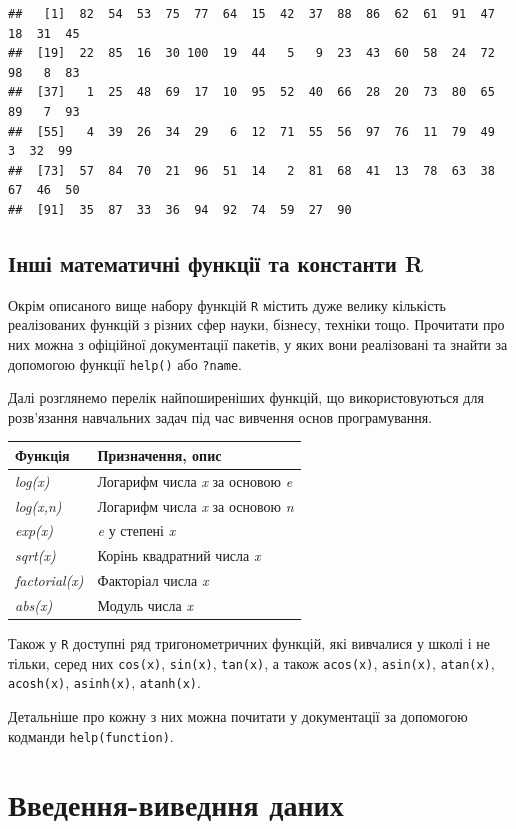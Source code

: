 \documentclass[
]{book}
\begin{document}
\begin{verbatim}
##   [1]  82  54  53  75  77  64  15  42  37  88  86  62  61  91  47  18  31  45
##  [19]  22  85  16  30 100  19  44   5   9  23  43  60  58  24  72  98   8  83
##  [37]   1  25  48  69  17  10  95  52  40  66  28  20  73  80  65  89   7  93
##  [55]   4  39  26  34  29   6  12  71  55  56  97  76  11  79  49   3  32  99
##  [73]  57  84  70  21  96  51  14   2  81  68  41  13  78  63  38  67  46  50
##  [91]  35  87  33  36  94  92  74  59  27  90
\end{verbatim}

\hypertarget{chapter244}{%
\subsection{Інші математичні функції та константи R}\label{chapter244}}

Окрім описаного вище набору функцій \texttt{R} містить дуже велику кількість реалізованих функцій з різних сфер науки, бізнесу, техніки тощо. Прочитати про них можна з офіційної документації пакетів, у яких вони реалізовані та знайти за допомогою функції \texttt{help()} або \texttt{?name}.

Далі розглянемо перелік найпоширеніших функцій, що використовуються для розв'язання навчальних задач під час вивчення основ програмування.

\begin{longtable}[]{@{}ll@{}}
\toprule
Функція & Призначення, опис\tabularnewline
\midrule
\endhead
\emph{log(x)} & Логарифм числа \emph{x} за основою \emph{e}\tabularnewline
\emph{log(x,n)} & Логарифм числа \emph{x} за основою \emph{n}\tabularnewline
\emph{exp(x)} & \emph{e} у степені \emph{x}\tabularnewline
\emph{sqrt(x)} & Корінь квадратний числа \emph{x}\tabularnewline
\emph{factorial(x)} & Факторіал числа \emph{x}\tabularnewline
\emph{abs(x)} & Модуль числа \emph{x}\tabularnewline
\bottomrule
\end{longtable}

Також у \texttt{R} доступні ряд тригонометричних функцій, які вивчалися у школі і не тільки, серед них \texttt{cos(x)}, \texttt{sin(x)}, \texttt{tan(x)}, а також \texttt{acos(x)}, \texttt{asin(x)}, \texttt{atan(x)}, \texttt{acosh(x)}, \texttt{asinh(x)}, \texttt{atanh(x)}.

Детальніше про кожну з них можна почитати у документації за допомогою кодманди \texttt{help(function)}.

\hypertarget{chapter245}{%
\section{Введення-виведння даних}\label{chapter245}}
\end{document}

